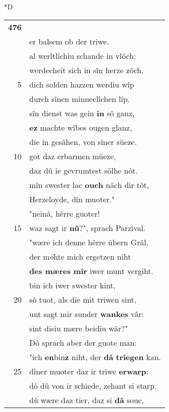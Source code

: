 \documentclass[8pt,a4paper,notitlepage]{article}
\begin{document}
\begin{table}[ht]
\begin{minipage}[t]{0.5\linewidth}
\small
\begin{center}*D
\end{center}
\begin{tabular}{rl}
\textbf{476} & \textit{\begin{large}M\end{large}}issewende was sîn riwe,\\ 
 & er balsem ob der triwe.\\ 
 & al werltlîchiu schande in vlôch;\\ 
 & werdecheit sich in sîn herze zôch.\\ 
5 & dich solden hazzen werdiu wîp\\ 
 & durch sînen minneclîchen lîp.\\ 
 & sîn dienst was gein \textbf{in} sô ganz,\\ 
 & \textbf{ez} machte wîbes ougen glanz,\\ 
 & die in gesâhen, von sîner süeze.\\ 
10 & got daz erbarmen müeze,\\ 
 & daz dû ie gevrumtest sölhe nôt.\\ 
 & mîn swester lac \textbf{ouch} nâch dir tôt,\\ 
 & Herzeloyde, dîn muoter."\\ 
 & "neinâ, hêrre guoter!\\ 
15 & waz sagt ir \textbf{nû}?", sprach Parzival.\\ 
 & "wære ich denne hêrre übern Grâl,\\ 
 & der m\textit{ö}hte mich ergetzen niht\\ 
 & \textbf{des mæres} \textbf{mir} iwer munt vergiht.\\ 
 & bin ich iwer swester kint,\\ 
20 & sô tuot, als die mit triwen sint,\\ 
 & unt sagt mir sunder \textbf{wankes} vâr:\\ 
 & sint disiu mære beidiu wâr?"\\ 
 & Dô sprach aber der guote man:\\ 
 & "ich \textbf{en}bin\textbf{z} niht, der \textbf{dâ} \textbf{triegen} kan.\\ 
25 & dîner muoter daz ir triwe \textbf{erwarp}:\\ 
 & dô dû von ir schiede, zehant si starp.\\ 
 & dû wære daz tier, daz si \textbf{dâ} souc,\\ 

\end{tabular}
\end{minipage}
\end{table}
\end{document}
